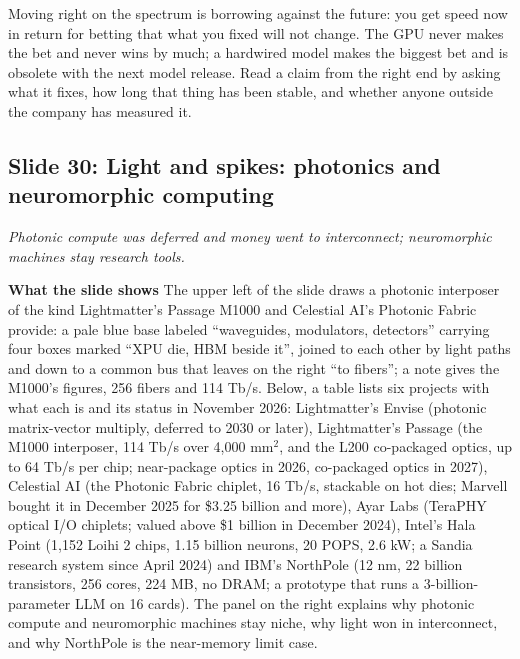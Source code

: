 \documentclass[11pt,letterpaper]{article}
\newcommand{\slide}[3]{%
  \subsection[Slide #1: #2]{Slide #1: #2}%
  {\color{muted}\itshape #3\par}\medskip}
\newcommand{\para}[1]{\medskip\noindent\textbf{#1}\quad}
\newenvironment{intuition}{\begin{tcolorbox}[intuitionbox]}{\end{tcolorbox}}
\begin{document}
\begin{intuition}
Moving right on the spectrum is borrowing against the future: you get speed now in return for betting that what you fixed will not change. The GPU never makes the bet and never wins by much; a hardwired model makes the biggest bet and is obsolete with the next model release. Read a claim from the right end by asking what it fixes, how long that thing has been stable, and whether anyone outside the company has measured it.
\end{intuition}

\slide{30}{Light and spikes: photonics and neuromorphic computing}{Photonic compute was deferred and money went to interconnect; neuromorphic machines stay research tools.}

\para{What the slide shows} The upper left of the slide draws a photonic interposer of the kind Lightmatter's Passage M1000 and Celestial AI's Photonic Fabric provide: a pale blue base labeled ``waveguides, modulators, detectors'' carrying four boxes marked ``XPU die, HBM beside it'', joined to each other by light paths and down to a common bus that leaves on the right ``to fibers''; a note gives the M1000's figures, 256 fibers and 114 Tb/s. Below, a table lists six projects with what each is and its status in November 2026: Lightmatter's Envise (photonic matrix-vector multiply, deferred to 2030 or later), Lightmatter's Passage (the M1000 interposer, 114 Tb/s over 4{,}000 mm$^2$, and the L200 co-packaged optics, up to 64 Tb/s per chip; near-package optics in 2026, co-packaged optics in 2027), Celestial AI (the Photonic Fabric chiplet, 16 Tb/s, stackable on hot dies; Marvell bought it in December 2025 for \$3.25 billion and more), Ayar Labs (TeraPHY optical I/O chiplets; valued above \$1 billion in December 2024), Intel's Hala Point (1{,}152 Loihi 2 chips, 1.15 billion neurons, 20 POPS, 2.6 kW; a Sandia research system since April 2024) and IBM's NorthPole (12 nm, 22 billion transistors, 256 cores, 224 MB, no DRAM; a prototype that runs a 3-billion-parameter LLM on 16 cards). The panel on the right explains why photonic compute and neuromorphic machines stay niche, why light won in interconnect, and why NorthPole is the near-memory limit case.
\end{document}
